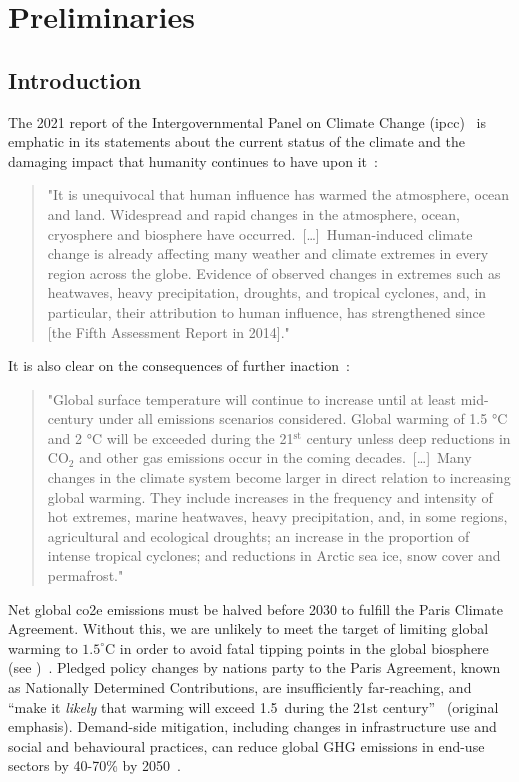 \documentclass[../SustainableHEP.tex]{subfiles}
\begin{document}
\newpage

\section{Preliminaries}
\label{sec:Introduction}

\subsection{Introduction}

The 2021 report of the Intergovernmental Panel on Climate Change (\acrshort{ipcc})~\cite{IPCC2021report} is emphatic in its statements about the current status of the climate and the damaging impact that humanity continues to have upon it~\cite{IPCC2021reportSPM}:
\begin{quotation}
"It is unequivocal that human influence has warmed the atmosphere, ocean and land. Widespread and rapid changes in the atmosphere, ocean, cryosphere and biosphere have occurred.\ [\dots]\ Human-induced climate change is already affecting many weather and climate extremes in every region 
across the globe. Evidence of observed changes in extremes such as heatwaves, heavy precipitation, droughts, 
and tropical cyclones, and, in particular, their attribution to human influence, has strengthened since [the Fifth Assessment Report in 2014]."
\end{quotation}
It is also clear on the consequences of further inaction~\cite{IPCC2021reportSPM}:
\begin{quotation}
"Global surface temperature will continue to increase until at least mid-century under all emissions scenarios
considered. Global warming of 1.5 °C and 2 °C will be exceeded during the 21$^\text{st}$ century unless deep reductions 
in $\mathrm{CO_2}$ and other  gas emissions occur in the coming decades.\ [\dots]\ Many changes in the climate system become larger in direct relation to increasing global warming. They 
include increases in the frequency and intensity of hot extremes, marine heatwaves, heavy precipitation, 
and, in some regions, agricultural and ecological droughts; an increase in the proportion of intense tropical 
cyclones; and reductions in Arctic sea ice, snow cover and permafrost."
\end{quotation}

Net global \acrshort{co2e} emissions must be halved before 2030 to fulfill the Paris Climate Agreement. Without this, we are unlikely to meet the  target of limiting global warming to $1.5^\circ$C in order to avoid fatal tipping points in the global biosphere (see )~\cite{IPCC19policy}. Pledged policy changes by nations party to the Paris Agreement, known as Nationally Determined Contributions, are insufficiently far-reaching, and ``make it {\it likely} that warming will exceed 1.5\degree\ during the 21st century''~\cite{IPCC2023SynthesisSPM} (original emphasis).  Demand-side mitigation, including changes in infrastructure use and social and behavioural practices, can reduce global GHG emissions in end-use sectors by 40-70\% by 
2050~\cite{IPCC2022reportSPM}.
\end{document}
